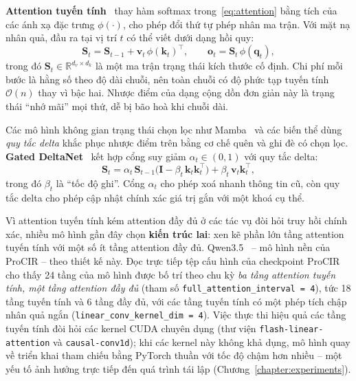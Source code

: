 \textbf{Attention tuyến tính}~\cite{katharopoulos2020linear} thay hàm softmax trong~\eqref{eq:attention} bằng tích của các ánh xạ đặc trưng $\phi(\cdot)$, cho phép đổi thứ tự phép nhân ma trận. Với mặt nạ nhân quả, đầu ra tại vị trí $t$ có thể viết dưới dạng hồi quy:
\begin{equation}
    \mathbf{S}_t = \mathbf{S}_{t-1} + \mathbf{v}_t\,\phi(\mathbf{k}_t)^\top, \qquad \mathbf{o}_t = \mathbf{S}_t\,\phi(\mathbf{q}_t),
\end{equation}
trong đó $\mathbf{S}_t \in \mathbb{R}^{d_v \times d_k}$ là một ma trận trạng thái kích thước cố định. Chi phí mỗi bước là hằng số theo độ dài chuỗi, nên toàn chuỗi có độ phức tạp tuyến tính $\mathcal{O}(n)$ thay vì bậc hai. Nhược điểm của dạng cộng dồn đơn giản này là trạng thái ``nhớ mãi'' mọi thứ, dễ bị bão hoà khi chuỗi dài.

Các mô hình không gian trạng thái chọn lọc như Mamba~\cite{gu2023mamba} và các biến thể dùng \emph{quy tắc delta} khắc phục nhược điểm trên bằng cơ chế quên và ghi đè có chọn lọc. \textbf{Gated DeltaNet}~\cite{yang2025gateddeltanet} kết hợp cổng suy giảm $\alpha_t \in (0,1)$ với quy tắc delta:
\begin{equation}
    \mathbf{S}_t = \alpha_t\,\mathbf{S}_{t-1}\big(\mathbf{I} - \beta_t\,\mathbf{k}_t\mathbf{k}_t^\top\big) + \beta_t\,\mathbf{v}_t\mathbf{k}_t^\top,
\end{equation}
trong đó $\beta_t$ là ``tốc độ ghi''. Cổng $\alpha_t$ cho phép xoá nhanh thông tin cũ, còn quy tắc delta cho phép cập nhật chính xác giá trị gắn với một khoá cụ thể.

Vì attention tuyến tính kém attention đầy đủ ở các tác vụ đòi hỏi truy hồi chính xác, nhiều mô hình gần đây chọn \textbf{kiến trúc lai}: xen kẽ phần lớn tầng attention tuyến tính với một số ít tầng attention đầy đủ. Qwen3.5~\cite{qwen2026qwen35} -- mô hình nền của ProCIR -- theo thiết kế này. Đọc trực tiếp tệp cấu hình của checkpoint ProCIR cho thấy 24 tầng của mô hình được bố trí theo chu kỳ \emph{ba tầng attention tuyến tính, một tầng attention đầy đủ} (tham số \texttt{full\_attention\_interval = 4}), tức 18 tầng tuyến tính và 6 tầng đầy đủ, với các tầng tuyến tính có một phép tích chập nhân quả ngắn (\texttt{linear\_conv\_kernel\_dim = 4}). Việc thực thi hiệu quả các tầng tuyến tính đòi hỏi các kernel CUDA chuyên dụng (thư viện \texttt{flash-linear-attention} và \texttt{causal-conv1d}); khi các kernel này không khả dụng, mô hình quay về triển khai tham chiếu bằng PyTorch thuần với tốc độ chậm hơn nhiều -- một yếu tố ảnh hưởng trực tiếp đến quá trình tái lập (Chương~\ref{chapter:experiments}).

